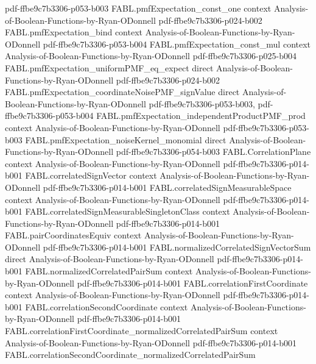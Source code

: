 \begin{theorem}
  {pdf-ffbe9c7b3306-p053-b003}
\proofstep
  {FABL.pmfExpectation_const_one}
  {context}
  {Analysis-of-Boolean-Functions-by-Ryan-ODonnell}
  {pdf-ffbe9c7b3306-p024-b002}
\proofstep
  {FABL.pmfExpectation_bind}
  {context}
  {Analysis-of-Boolean-Functions-by-Ryan-ODonnell}
  {pdf-ffbe9c7b3306-p053-b004}
\proofstep
  {FABL.pmfExpectation_const_mul}
  {context}
  {Analysis-of-Boolean-Functions-by-Ryan-ODonnell}
  {pdf-ffbe9c7b3306-p025-b004}
\proofstep
  {FABL.pmfExpectation_uniformPMF_eq_expect}
  {direct}
  {Analysis-of-Boolean-Functions-by-Ryan-ODonnell}
  {pdf-ffbe9c7b3306-p024-b002}
\proofstep
  {FABL.pmfExpectation_coordinateNoisePMF_signValue}
  {direct}
  {Analysis-of-Boolean-Functions-by-Ryan-ODonnell}
  {pdf-ffbe9c7b3306-p053-b003,
    pdf-ffbe9c7b3306-p053-b004}
\proofstep
  {FABL.pmfExpectation_independentProductPMF_prod}
  {context}
  {Analysis-of-Boolean-Functions-by-Ryan-ODonnell}
  {pdf-ffbe9c7b3306-p053-b003}
\proofstep
  {FABL.pmfExpectation_noiseKernel_monomial}
  {direct}
  {Analysis-of-Boolean-Functions-by-Ryan-ODonnell}
  {pdf-ffbe9c7b3306-p054-b003}
\proofstep
  {FABL.CorrelationPlane}
  {context}
  {Analysis-of-Boolean-Functions-by-Ryan-ODonnell}
  {pdf-ffbe9c7b3306-p014-b001}
\proofstep
  {FABL.correlatedSignVector}
  {context}
  {Analysis-of-Boolean-Functions-by-Ryan-ODonnell}
  {pdf-ffbe9c7b3306-p014-b001}
\proofstep
  {FABL.correlatedSignMeasurableSpace}
  {context}
  {Analysis-of-Boolean-Functions-by-Ryan-ODonnell}
  {pdf-ffbe9c7b3306-p014-b001}
\proofstep
  {FABL.correlatedSignMeasurableSingletonClass}
  {context}
  {Analysis-of-Boolean-Functions-by-Ryan-ODonnell}
  {pdf-ffbe9c7b3306-p014-b001}
\proofstep
  {FABL.pairCoordinatesEquiv}
  {context}
  {Analysis-of-Boolean-Functions-by-Ryan-ODonnell}
  {pdf-ffbe9c7b3306-p014-b001}
\proofstep
  {FABL.normalizedCorrelatedSignVectorSum}
  {direct}
  {Analysis-of-Boolean-Functions-by-Ryan-ODonnell}
  {pdf-ffbe9c7b3306-p014-b001}
\proofstep
  {FABL.normalizedCorrelatedPairSum}
  {context}
  {Analysis-of-Boolean-Functions-by-Ryan-ODonnell}
  {pdf-ffbe9c7b3306-p014-b001}
\proofstep
  {FABL.correlationFirstCoordinate}
  {context}
  {Analysis-of-Boolean-Functions-by-Ryan-ODonnell}
  {pdf-ffbe9c7b3306-p014-b001}
\proofstep
  {FABL.correlationSecondCoordinate}
  {context}
  {Analysis-of-Boolean-Functions-by-Ryan-ODonnell}
  {pdf-ffbe9c7b3306-p014-b001}
\proofstep
  {FABL.correlationFirstCoordinate_normalizedCorrelatedPairSum}
  {context}
  {Analysis-of-Boolean-Functions-by-Ryan-ODonnell}
  {pdf-ffbe9c7b3306-p014-b001}
\proofstep
  {FABL.correlationSecondCoordinate_normalizedCorrelatedPairSum}

\end{theorem}
